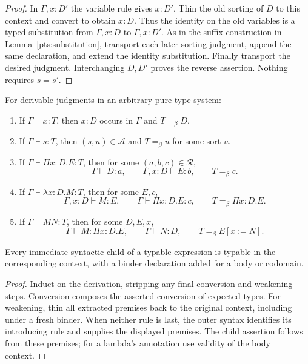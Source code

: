 \begin{proof}
In $\Gamma,x:D'$ the variable rule gives $x:D'$. Thin the old sorting
of $D$ to this context and convert to obtain $x:D$. Thus the identity
on the old variables is a typed substitution from $\Gamma,x:D$ to
$\Gamma,x:D'$. As in the suffix construction in
Lemma~\ref{pts:substitution}, transport each later sorting judgment,
append the same declaration, and extend the identity substitution.
Finally transport the desired judgment. Interchanging $D,D'$ proves
the reverse assertion. Nothing requires $s=s'$.
\end{proof}

\begin{lemma}[Generation]\label{pts:generation}
For derivable judgments in an arbitrary pure type system:
\begin{enumerate}
\item If $\Gamma\vdash x:T$, then $x:D$ occurs in $\Gamma$ and
      $T=_\beta D$.
\item If $\Gamma\vdash s:T$, then $(s,u)\in\mathcal A$ and
      $T=_\beta u$ for some sort $u$.
\item If $\Gamma\vdash\Pi x:D.E:T$, then for some
      $(a,b,c)\in\mathcal R$,
      \[
       \Gamma\vdash D:a,\qquad
       \Gamma,x:D\vdash E:b,\qquad T=_\beta c.
      \]
\item If $\Gamma\vdash\lambda x:D.M:T$, then for some $E,c$,
      \[
       \Gamma,x:D\vdash M:E,\qquad
       \Gamma\vdash\Pi x:D.E:c,\qquad
       T=_\beta\Pi x:D.E.
      \]
\item If $\Gamma\vdash MN:T$, then for some $D,E,x$,
      \[
       \Gamma\vdash M:\Pi x:D.E,\qquad
       \Gamma\vdash N:D,\qquad T=_\beta E[x:=N].
      \]
\end{enumerate}
Every immediate syntactic child of a typable expression is typable
in the corresponding context, with a binder declaration added for a
body or codomain.
\end{lemma}

\begin{proof}
Induct on the derivation, stripping any final conversion and weakening
steps. Conversion composes the asserted conversion of expected types.
For weakening, thin all extracted premises back to the original
context, including under a fresh binder. When neither rule is last,
the outer syntax identifies its introducing rule and supplies the
displayed premises. The child assertion follows from these premises;
for a lambda's annotation use validity of the body context.
\end{proof}

